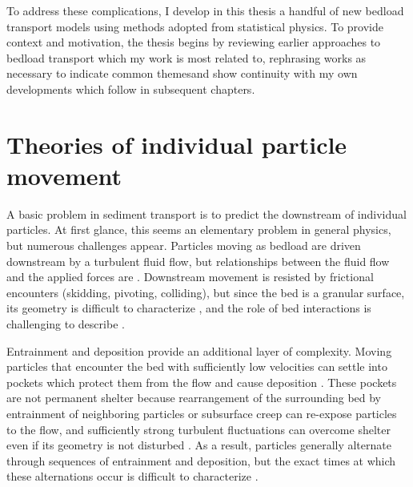 To address these complications, I develop in this thesis a handful of new bedload transport models using methods adopted from statistical physics.
To provide context and motivation, the thesis begins by reviewing earlier approaches to bedload transport which my work is most related to, rephrasing works as necessary \DIFdelbegin {}\DIFdelend to indicate common themes\DIFaddbegin {}\DIFaddend and show continuity with my own developments which follow in subsequent chapters.

\section{Theories of individual particle movement}
\label{sec:trajmodels}

A basic problem in sediment transport \DIFdelbegin {}\DIFdelend \DIFaddbegin {}\DIFaddend is to predict the downstream \DIFdelbegin {}\DIFdelend \DIFaddbegin {}\DIFaddend of individual particles.
At first glance, this seems an elementary problem in general physics, but numerous challenges appear.
Particles moving as bedload are driven downstream by a turbulent fluid flow, but \DIFdelbegin {}\DIFdelend relationships between the fluid flow and the applied forces are \DIFdelbegin {}\DIFdelend \DIFaddbegin {}\DIFaddend .
Downstream movement is resisted by frictional encounters \DIFaddbegin {}\DIFaddend (skidding, pivoting, colliding)\DIFdelbegin {}\DIFdelend , but since the bed is a granular surface, its geometry is difficult to characterize \citep{Gordon1972}, and the role of bed interactions is challenging to describe \citep{Sekine1992, Nino1998}.

Entrainment and deposition provide an additional layer of complexity.
Moving particles that encounter the bed with sufficiently low velocities can settle into pockets which protect them from the flow \citep{Miller1966} and cause deposition \citep{Charru2004}.
These pockets are not permanent shelter because rearrangement of the surrounding bed by entrainment of neighboring particles or subsurface creep \citep{Houssais2016,Frey2014} can re-expose particles to the flow, and sufficiently strong turbulent fluctuations \DIFdelbegin {}\DIFdelend \DIFaddbegin {}\DIFaddend can overcome shelter even if its geometry is not disturbed \citep{Valyrakis2010,Celik2014}. 
As a result, particles generally alternate through sequences of entrainment and deposition, but the exact times at which these alternations occur is difficult to characterize \citep{Einstein1937}.

